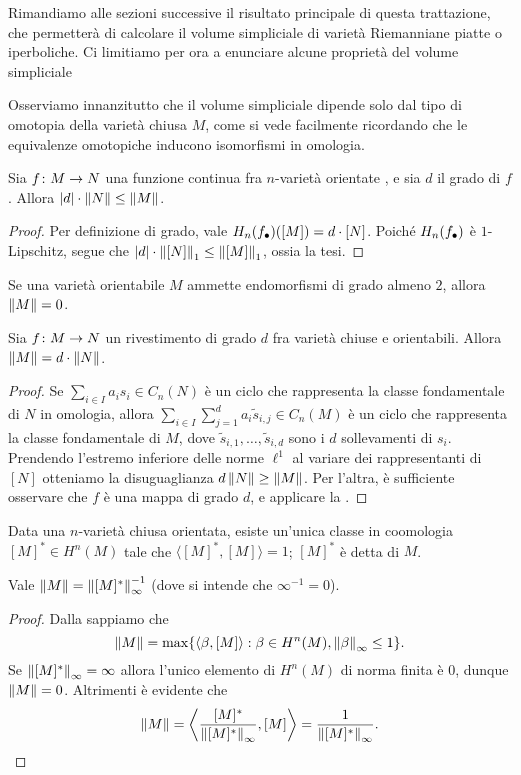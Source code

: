 Rimandiamo alle sezioni successive il risultato principale di questa trattazione, che permetterà di calcolare il volume simpliciale di varietà Riemanniane piatte o iperboliche. Ci limitiamo per ora a enunciare alcune proprietà del volume simpliciale

Osserviamo innanzitutto che il volume simpliciale dipende solo dal tipo di omotopia della varietà chiusa $M$, come si vede facilmente ricordando che le equivalenze omotopiche inducono isomorfismi in omologia.

\begin{proposition}
Sia $\map{f}{M}{N}$ una funzione continua fra $n$-varietà orientate , e sia $d$ il grado di $f$. Allora $|d|\cdot\left\lVert N\right\rVert\le\left\lVert M\right\rVert$.
\end{proposition}
\begin{proof}
Per definizione di grado, vale $H_n(f_\bullet)([M])=d\cdot[N]$. Poiché $H_n(f_\bullet)$ è $1$-Lipschitz, segue che $|d|\cdot\left\lVert [N]\right\rVert_1\le\left\lVert [M]\right\rVert_1$, ossia la tesi.
\end{proof}

\begin{corollary}
Se una varietà orientabile $M$ ammette endomorfismi di grado almeno $2$, allora $\left\lVert M\right\rVert=0$.
\end{corollary}

\begin{proposition}
Sia $\map{f}{M}{N}$ un rivestimento di grado $d$ fra varietà chiuse e orientabili. Allora $\left\lVert M\right\rVert=d\cdot\left\lVert N\right\rVert$.
\end{proposition}
\begin{proof}
Se $\sum_{i\in I}a_is_i\in C_n(N)$ è un ciclo che rappresenta la classe fondamentale di $N$ in omologia, allora $\sum_{i\in I}\sum_{j=1}^da_i\widetilde{s}_{i,j}\in C_n(M)$ è un ciclo che rappresenta la classe fondamentale di $M$, dove $\widetilde{s}_{i,1},\ldots,\widetilde{s}_{i,d}$ sono i $d$ sollevamenti di $s_i$. Prendendo l'estremo inferiore delle norme $\ell^1$ al variare dei rappresentanti di $[N]$ otteniamo la disuguaglianza $d\left\lVert N\right\rVert\ge\left\lVert M\right\rVert$. Per l'altra, è sufficiente osservare che $f$ è una mappa di grado $d$, e applicare la .
\end{proof}

Data una $n$-varietà chiusa orientata, esiste un'unica classe in coomologia $[M]^*\in H^n(M)$ tale che $\langle[M]^*,[M]\rangle=1$; $[M]^*$ è detta  di $M$.
\begin{proposition}
Vale $\left\lVert M\right\rVert=\left\lVert [M]^*\right\rVert_\infty^{-1}$ (dove si intende che $\infty^{-1}=0$).
\end{proposition}
\begin{proof}
Dalla  sappiamo che
\[
\left\lVert M\right\rVert=\max\{\langle\beta,[M]\rangle:\beta\in H^n(M),\left\lVert \beta\right\rVert_\infty\le 1\}.
\]
Se $\left\lVert [M]^*\right\rVert_\infty=\infty$ allora l'unico elemento di $H^n(M)$ di norma finita è $0$, dunque $\left\lVert M\right\rVert=0$. Altrimenti è evidente che
\[
\left\lVert M\right\rVert=\left\langle\frac{[M]^*}{\left\lVert [M]^*\right\rVert_\infty},[M]\right\rangle=\frac{1}{\left\lVert [M]^*\right\rVert_\infty}.\qedhere
\]
\end{proof}
